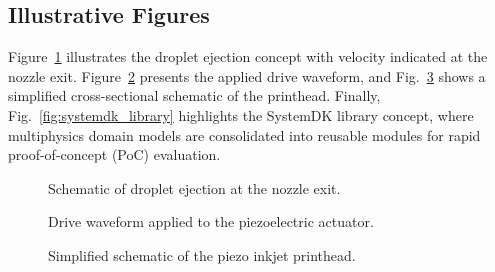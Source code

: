 \documentclass[conference]{IEEEtran}
\begin{document}
\subsection{Illustrative Figures}
Figure~\ref{fig:droplet} illustrates the droplet ejection concept with velocity indicated at the nozzle exit.  
Figure~\ref{fig:waveform} presents the applied drive waveform, and Fig.~\ref{fig:head} shows a simplified cross-sectional schematic of the printhead.  
Finally, Fig.~\ref{fig:systemdk_library} highlights the SystemDK library concept, where multiphysics domain models are consolidated into reusable modules for rapid proof-of-concept (PoC) evaluation.

\begin{figure}[t]
\centering
{}
\caption{Schematic of droplet ejection at the nozzle exit.}
\label{fig:droplet}
\end{figure}

\begin{figure}[t]
\centering
{}
\caption{Drive waveform applied to the piezoelectric actuator.}
\label{fig:waveform}
\end{figure}

\begin{figure}[t]
\centering
{}
\caption{Simplified schematic of the piezo inkjet printhead.}
\label{fig:head}
\end{figure}
\end{document}
